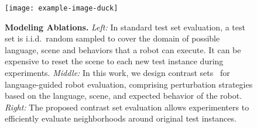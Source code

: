 \begin{figure}[b]
    \centering
    \texttt{[image: example-image-duck]}
    \caption{\textbf{Modeling Ablations.} \textit{Left:} In standard test set evaluation, a test set is i.i.d.~random sampled to cover the domain of possible language, scene and behaviors that a robot can execute. It can be expensive to reset the scene to each new test instance during experiments. \textit{Middle:} In this work, we design contrast sets~\cite{gardner2020evaluating} for language-guided robot evaluation, comprising perturbation strategies based on the language, scene, and expected behavior of the robot. \textit{Right:} The proposed contrast set evaluation allows experimenters to efficiently evaluate neighborhoods around original test instances. 
    }
    \label{fig:model_ablations}
\end{figure}

